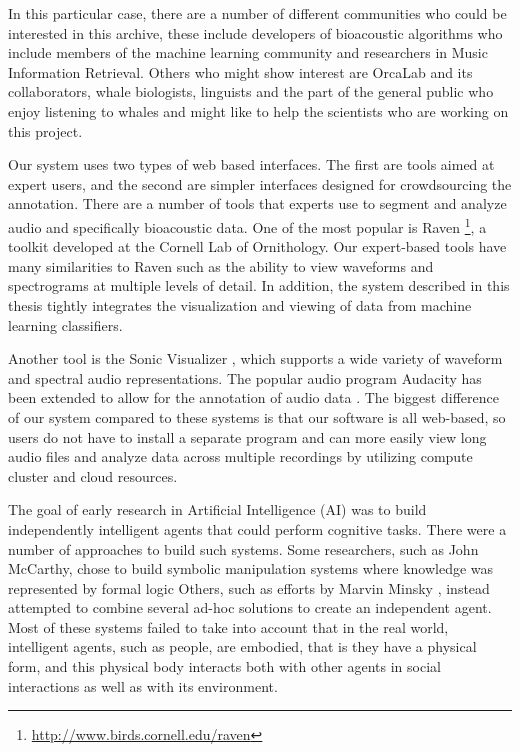 In this particular case, there are a number of different communities
who could be interested in this archive, these include developers of
bioacoustic algorithms who include members of the machine learning
community \cite{clark2012dcl} and researchers in Music Information
Retrieval.  Others who might show interest are OrcaLab and its
collaborators, whale biologists, linguists and the part of the general
public who enjoy listening to whales and might like to help the
scientists who are working on this project.

Our system uses two types of web based interfaces.  The first are
tools aimed at expert users, and the second are simpler interfaces
designed for crowdsourcing the annotation. There are a number of tools
that experts use to segment and analyze audio and specifically
bioacoustic data.  One of the most popular is Raven
\footnote{\url{http://www.birds.cornell.edu/raven}}, a toolkit
developed at the Cornell Lab of Ornithology.  Our expert-based tools
have many similarities to Raven such as the ability to view waveforms
and spectrograms at multiple levels of detail. In addition, the system
described in this thesis tightly integrates the visualization and
viewing of data from machine learning classifiers.

Another tool is the Sonic Visualizer \cite{cannam2010sonic}, which
supports a wide variety of waveform and spectral audio
representations. The popular audio program Audacity has been extended
to allow for the annotation of audio data \cite{li2006auacity}.  The
biggest difference of our system compared to these systems is that our
software is all web-based, so users do not have to install a separate
program and can more easily view long audio files and analyze data
across multiple recordings by utilizing compute cluster and cloud
resources.

The goal of early research in Artificial Intelligence (AI) was to
build independently intelligent agents that could perform cognitive
tasks.  There were a number of approaches to build such systems.  Some
researchers, such as John McCarthy, chose to build symbolic
manipulation systems where knowledge was represented by formal logic
\cite{mccarthy1968some} Others, such as efforts by Marvin Minsky
\cite{minsky1961steps}, instead attempted to combine several ad-hoc
solutions to create an independent agent.  Most of these systems
failed to take into account that in the real world, intelligent
agents, such as people, are embodied, that is they have a physical
form, and this physical body interacts both with other agents in
social interactions as well as with its environment.

